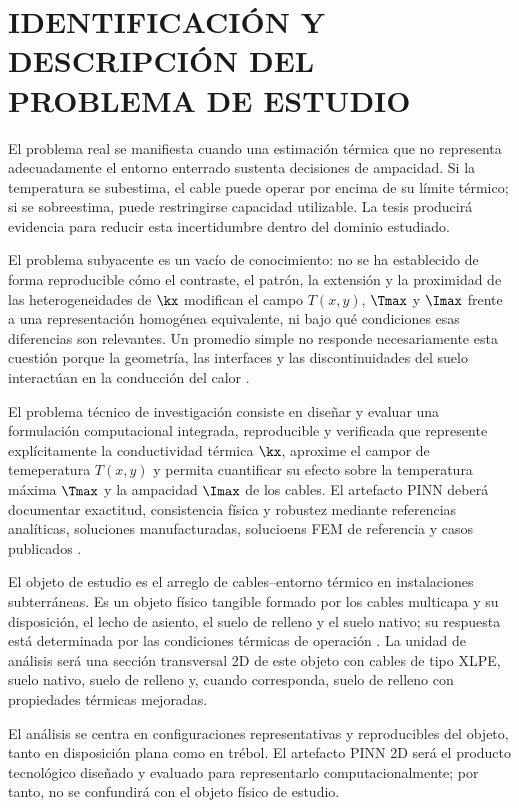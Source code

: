 \section{IDENTIFICACIÓN Y DESCRIPCIÓN DEL PROBLEMA DE ESTUDIO}
\label{sec:planteamiento-problema}

El problema real se manifiesta cuando una estimación térmica que no representa adecuadamente el entorno enterrado sustenta decisiones de ampacidad. Si la temperatura se subestima, el cable puede operar por encima de su límite térmico; si se sobreestima, puede restringirse capacidad utilizable. La tesis  producirá evidencia para reducir esta incertidumbre dentro del dominio estudiado.

El problema subyacente es un vacío de conocimiento: no se ha establecido de forma reproducible cómo el contraste, el patrón, la extensión y la proximidad de las heterogeneidades de $\kx$ modifican el campo $T(x,y)$, $\Tmax$ y $\Imax$ frente a una representación homogénea equivalente, ni bajo qué condiciones esas diferencias son relevantes. Un promedio simple no responde necesariamente esta cuestión porque la geometría, las interfaces y las discontinuidades del suelo interactúan en la conducción del calor \parencites[4--6]{enescu2021}[3--4,93--99]{cigre2025}.

El problema técnico de investigación consiste en diseñar y evaluar una formulación computacional integrada, reproducible y verificada que represente explícitamente la conductividad térmica $\kx$, aproxime el campor de temeperatura $T(x,y)$ y permita cuantificar su efecto sobre la temperatura máxima $\Tmax$ y la ampacidad $\Imax$ de los cables. El artefacto PINN deberá documentar exactitud, consistencia física y robustez mediante referencias analíticas, soluciones manufacturadas, solucioens FEM de referencia y casos publicados \parencites{iec60287}{iec60853}[3--4,93--99]{cigre2025}[686--690]{raissi2019}.

El objeto de estudio es el arreglo de cables--entorno térmico en instalaciones subterráneas. Es un objeto físico tangible formado por los cables multicapa y su disposición, el lecho de asiento, el suelo de relleno y el suelo nativo; su respuesta está determinada por las condiciones térmicas de operación \parencites[3--6]{enescu2021}{ieee442}[1,10]{kim2025}. La unidad de análisis será una sección transversal 2D de este objeto con cables de tipo XLPE, suelo nativo, suelo de relleno y, cuando corresponda, suelo de relleno con propiedades térmicas mejoradas.

El análisis se centra en configuraciones representativas y reproducibles del objeto, tanto en disposición plana como en trébol. El artefacto PINN 2D será el producto tecnológico diseñado y evaluado para representarlo computacionalmente; por tanto, no se confundirá con el objeto físico de estudio.

